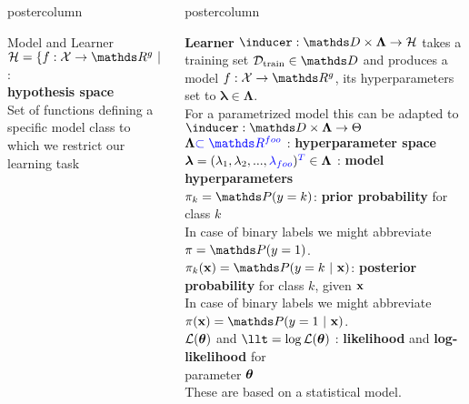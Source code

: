\documentclass{beamer}
\newlength{\columnheight} %
\begin{document}
\begin{frame}[fragile]{}
\begin{columns}
\begin{column}{.31\textwidth}
\begin{beamercolorbox}[center]{postercolumn}
\begin{minipage}{.98\textwidth}
{\begin{myblock}{Model and Learner}
$\Hspace = \{f : \Xspace \rightarrow \R^g ~|~ f \text{ belongs to a certain functional family}\}$ : \\ \textbf{hypothesis space} \\
Set of functions defining a specific model class to which we restrict our \\
learning task 					
\end{myblock}\vfill
				}
			\end{minipage}
		\end{beamercolorbox}
	\end{column}
	\begin{column}{.31\textwidth}
		\begin{beamercolorbox}[center]{postercolumn}
			\begin{minipage}{.98\textwidth}
				\parbox[t][\columnheight]{\textwidth}{
\begin{myblock}{} \vspace{-4ex}
\textbf{Learner }$\inducer: \preimageInducerShort \rightarrow \Hspace$  takes a training set  $\Dtrain \in \allDatasets$  and produces a model $f : \Xspace \rightarrow \R^g$, its hyperparameters set to $\bm{\lambda} \in \bm{\Lambda}$.\\
For a parametrized model this can be adapted to $\inducer: \preimageInducerShort \rightarrow \Theta$ \\

$\bm{\Lambda} \textcolor{blue}{\subset \R^{foo}}$ : \textbf{hyperparameter space} \\

$\bm{\lambda} = (\lambda_1, \lambda_2, ..., \textcolor{blue}{\lambda_{foo}})^{\textcolor{blue}{T}} \in \bm{\Lambda}$ : \textbf{model hyperparameters} \\

$\pi_k = \P(y = k)$:\textbf{ prior probability} for class $k$ \\
In case of binary labels we might abbreviate $\pi = \P(y = 1)$. \\

$\pikx = \postk$: \textbf{posterior probability} for class $k$, given $\mathbf{x}$ \\
In case of binary labels we might abbreviate $\pix = \post$. \\

$\mathcal{L}(\bm{\theta})$ and $\llt = \log\LLt$ : \textbf{likelihood} and \textbf{log-likelihood} for \\ parameter $\bm{\theta}$ \\
These are based on a statistical model.\\
 

\end{myblock}}
\end{minipage}
\end{beamercolorbox}
\end{column}
\end{columns}
\end{frame}
\end{document}
